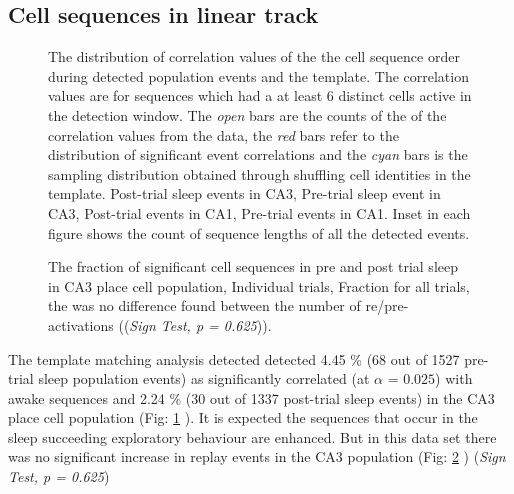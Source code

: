 



\subsection{Cell sequences in linear track}

\begin{figure}[H]
\centering
{}
\caption[Template matching analysis]{The distribution of correlation values of the the cell sequence order during detected population events and the template. The correlation values are for sequences which had a at least 6 distinct cells active in the detection window. The \emph{open} bars are the counts of the of the correlation values from the data, the \emph{red} bars refer to the distribution of significant event correlations and the \emph{cyan} bars is the sampling distribution obtained through shuffling cell identities in the template.  Post-trial sleep events in CA3,   Pre-trial sleep event in CA3,  Post-trial events in CA1,   Pre-trial events in CA1. Inset in each figure shows the count of sequence lengths of all the detected events.}
\label{tmcorr}
\end{figure}

\begin{figure}[H!]
\centering
{}
\caption[Pre and post trial sleep events CA3]{The fraction of significant cell sequences in pre and post trial sleep in CA3 place cell population,  Individual trials,  Fraction for all trials, the was no difference found between the number of re/pre-activations ((\emph{Sign Test, p = 0.625})).}
\label{fig:pre2postca3}
\end{figure}
The template matching analysis detected detected 4.45 \% (68 out of 1527 pre-trial sleep population events) as significantly correlated (at $ \alpha $ = $0.025$) with awake sequences and 2.24 \% (30 out of 1337 post-trial sleep events) in the CA3 place cell population (Fig: \ref{tmcorr} ). It is expected the sequences that occur in the sleep succeeding exploratory behaviour are enhanced. But in this data set there was no significant increase in replay events in the CA3 population (Fig: \ref{fig:pre2postca3} ) (\emph{Sign Test, p = 0.625})

